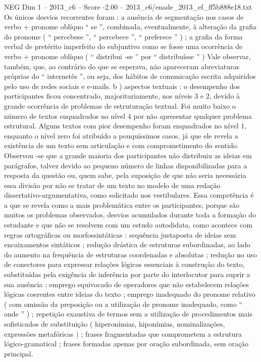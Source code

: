 \begin{textsample}{NEG Dim 1 – 2013\_c6 – Score -2.00 – 2013\_c6/enade\_2013\_ef\_ff5b888e18.txt}
Os únicos desvios recorrentes foram : a ausência de segmentação nos casos de verbo + pronome oblíquo “ se ”, combinada, eventualmente, à alteração da grafia do pronome ( “ percebese ”, “ percebece ”, “ preferece ” ) ; a grafia da forma verbal de pretérito imperfeito do subjuntivo como se fosse uma ocorrência de verbo + pronome oblíquo ( “ distribui -se ” por “ distribuísse ” ) Vale observar, também, que, ao contrário do que se esperava, não apareceram abreviaturas próprias do “ internetês ”, ou seja, dos hábitos de comunicação escrita adquiridos pelo uso de redes sociais e e-mails. b ) aspectos textuais : o desempenho dos participantes ficou concentrado, majoritariamente, nos níveis 3 e 2, devido à grande ocorrência de problemas de estruturação textual.
Foi muito baixo o número de textos enquadrados no nível 4 por não apresentar qualquer problema estrutural.
Alguns textos com pior desempenho foram enquadrados no nível 1, enquanto o nível zero foi atribuído a pouquíssimos casos, já que ele revela a existência de um texto sem articulação e com comprometimento do sentido.
Observou -se que a grande maioria dos participantes não distribuiu as ideias em parágrafos, talvez devido ao pequeno número de linhas disponibilizadas para a resposta da questão ou, quem sabe, pela suposição de que não seria necessária essa divisão por não se tratar de um texto no modelo de uma redação dissertativo-argumentativa, como solicitado nos vestibulares.
Essa competência é a que se revela como a mais problemática entre os participantes, porque são muitos os problemas observados, desvios acumulados durante toda a formação do estudante e que não se resolvem com um estudo autodidata, como acontece com regras ortográficas ou morfossintáticas : sequência justaposta de ideias sem encaixamentos sintáticos ; redução drástica de estruturas subordinadas, ao lado do aumento na frequência de estruturas coordenadas e absolutas ; redução no uso de conectores para expressar relações lógicas essenciais à construção do texto, substituídas pela exigência de inferência por parte do interlocutor para suprir a sua ausência ; emprego equivocado de operadores que não estabelecem relações lógicas coerentes entre ideias do texto ; emprego inadequado do pronome relativo ( com omissão da preposição ou a utilização de pronome inadequado, como “ onde ” ) ; repetição exaustiva de termos sem a utilização de procedimentos mais sofisticados de substituição ( hiperonímias, hiponímias, nominalizações, expressões metafóricas ) ; frases fragmentadas que comprometem a estrutura lógico-gramatical ; frases formadas apenas por oração subordinada, sem oração principal.

\end{textsample}
